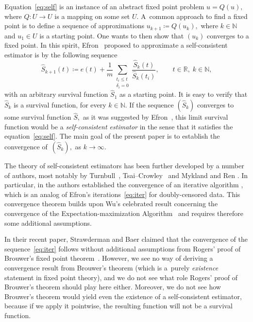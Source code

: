 \documentclass{amsart}
\theoremstyle{plain}
\theoremstyle{definition}
\def\l{\left}
\def\r{\right}
\def\as{\coloneqq}
\def\nat{\mathbb{N}}
\def\rls{\mathbb{R}}
\newcommand{\rec}[1]{\frac{1}{#1}}
\def\col{\colon}
\renewcommand{\hat}{\widehat}
\begin{document}
Equation~\eqref{eq:self} is an instance of an abstract fixed point problem $u=Q(u),$ where $Q\col U\to U$ is a mapping on some set $U.$ A~common approach to find a fixed point is to define a sequence of approximations $u_{k+1}\as Q\l(u_k\r),$ where $k\in\nat$ and $u_1\in U$ is a starting point. One wants to then show that $\l(u_k\r)$ converges to a fixed point. In this spirit, Efron~\cite{efron} proposed to approximate a self-consistent estimator is by the following sequence 
\begin{equation} \label{eq:iter}
 \hat{S}_{k+1}(t) \as e(t) + \rec{m} \sum_{\substack{t_i\le t \\ \delta_i=0}}\frac{\hat{S}_k(t)}{\hat{S}_k\l(t_i\r)},\qquad t\in\rls,\;k\in\nat,
\end{equation}
with an arbitrary survival function $\hat{S}_1$ as a starting point. It is easy to verify that $\hat{S}_k$ is a survival function, for every $k\in\nat.$ If the sequence $\l(\hat{S}_k\r)$ converges to some survival function $\hat{S},$ as it was suggested by Efron~\cite{efron}, this limit survival function would be a \emph{self-consistent estimator} in the sense that it satisfies the equation~\eqref{eq:self}. The main goal of the present paper is to establish the convergence of~$\l(\hat{S}_k\r),$ as $k\to\infty.$


The theory of self-consistent estimators has been further developed by a number of authors, most notably by Turnbull~\cite{turnbull}, Tsai--Crowley~\cite{tsai} and Mykland and Ren \cite{mykland-ren}. In particular, in \cite[Theorem 6]{mykland-ren} the authors established the convergence of an iterative algorithm \cite[(2.5)]{mykland-ren}, which is an analog of Efron's iterations~\eqref{eq:iter} for doubly-censored data. This convergence theorem builds upon Wu's celebrated result concerning the convergence of the Expectation-maximization Algorithm~\cite{wu} and requires therefore some additional assumptions.

In their recent paper, Strawderman and Baer \cite[Eq. (2)]{strawderman} claimed that the convergence of the sequence~\eqref{eq:iter} follows without additional assumptions from Rogers' proof of Brouwer's fixed point theorem~\cite{rogers}. However, we see no way of deriving a convergence result from Brouwer's theorem (which is a~purely \emph{existence} statement in fixed point theory), and we do not see what role Rogers' proof of Brouwer's theorem should play here either. Moreover, we do not see how Brouwer's theorem would yield even the existence of a self-consistent
estimator, because if we apply it pointwise, the resulting function will not be a survival function.
\end{document}
